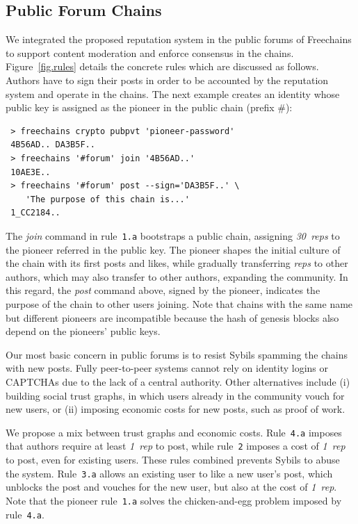 \documentclass[10pt,journal,compsoc]{IEEEtran}
\newcommand{\FC}       {Freechains\xspace}
\newcommand{\reps}     {\emph{reps}\xspace}
\newcommand{\onerep}   {\emph{1~rep}\xspace}
\newcommand{\nreps}[1] {\emph{#1~reps\xspace}}
\begin{document}
\subsection{Public Forum Chains}
\label{sec.consensus.chains}

We integrated the proposed reputation system in the public forums of \FC to
support content moderation and enforce consensus in the chains.
Figure~\ref{fig.rules} details the concrete rules which are discussed as
follows.
Authors have to sign their posts in order to be accounted by the reputation
system and operate in the chains.
The next example creates an identity whose public key is assigned as the
pioneer in the public chain (prefix $\#$):

{\footnotesize
\begin{verbatim}
 > freechains crypto pubpvt 'pioneer-password'
 4B56AD.. DA3B5F..
 > freechains '#forum' join '4B56AD..'
 10AE3E..
 > freechains '#forum' post --sign='DA3B5F..' \
    'The purpose of this chain is...'
 1_CC2184..
\end{verbatim}
}

The \emph{join} command in rule~\texttt{1.a} bootstraps a public chain,
assigning \nreps{30} to the pioneer referred in the public key.
The pioneer shapes the initial culture of the chain with its first posts and
likes, while gradually transferring \reps to other authors, which may also
transfer to other authors, expanding the community.
%
In this regard, the \emph{post} command above, signed by the pioneer, indicates
the purpose of the chain to other users joining.
%
Note that chains with the same name but different pioneers are incompatible
because the hash of genesis blocks also depend on the pioneers' public keys.

Our most basic concern in public forums is to resist Sybils spamming the chains
with new posts.
Fully peer-to-peer systems cannot rely on identity logins or CAPTCHAs due
to the lack of a central authority.
Other alternatives include (i) building social trust graphs, in which users
already in the community vouch for new users, or (ii) imposing economic costs
for new posts, such as proof of work.

We propose a mix between trust graphs and economic costs.
Rule~\texttt{4.a} imposes that authors require at least \onerep to post, while
rule~\texttt{2} imposes a cost of \onerep to post, even for existing users.
These rules combined prevents Sybils to abuse the system.
Rule~\texttt{3.a} allows an existing user to like a new user's post, which
unblocks the post and vouches for the new user, but also at the cost of
\onerep.
%
Note that the pioneer rule~\texttt{1.a} solves the chicken-and-egg problem
imposed by rule~\texttt{4.a}.
\end{document}
